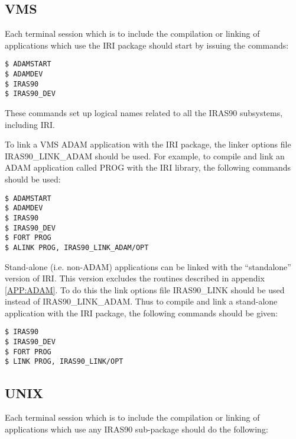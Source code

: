 \subsection{VMS}
Each terminal session which is to include the compilation or linking of
applications which use the IRI package should start by issuing the commands:

\begin{verbatim}
$ ADAMSTART
$ ADAMDEV
$ IRAS90
$ IRAS90_DEV
\end{verbatim}

These commands set up logical names related to all the IRAS90
subsystems, including IRI.

To link a VMS ADAM application with the IRI package, the linker options file
IRAS90\_LINK\_ADAM should be used. For example, to compile and link an ADAM
application called PROG with the IRI library, the following commands should be
used:

\begin{verbatim}
$ ADAMSTART
$ ADAMDEV
$ IRAS90
$ IRAS90_DEV
$ FORT PROG
$ ALINK PROG, IRAS90_LINK_ADAM/OPT
\end{verbatim}

Stand-alone (i.e. non-ADAM) applications can be linked with the ``standalone''
version of IRI. This version excludes the routines described in appendix
\ref{APP:ADAM}. To do this the link options file IRAS90\_LINK should be used
instead of IRAS90\_LINK\_ADAM. Thus to compile and link a stand-alone
application with the IRI package, the following commands should be given:

\begin{verbatim}
$ IRAS90
$ IRAS90_DEV
$ FORT PROG
$ LINK PROG, IRAS90_LINK/OPT
\end{verbatim}

\subsection{UNIX}


Each terminal session which is to include the compilation or linking of
applications which use any IRAS90 sub-package should do the following:

